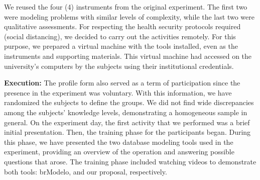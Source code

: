 We reused the four (4) instruments from the original experiment. 
The first two were modeling problems with similar levels of complexity, while the last two were qualitative assessments.
For respecting the health security protocols required (social distancing), we decided to carry out the activities remotely.
For this purpose, we prepared a virtual machine with the tools installed, even as the instruments and supporting materials. 
This virtual machine had accessed on the university's computers by the subjects using their institutional credentials.

\textbf{Execution:} 
The profile form also served as a term of participation since the presence in the experiment was voluntary.
With this information, we have randomized the subjects to define the groups.
We did not find wide discrepancies among the subjects' knowledge levels, demonstrating a homogeneous sample in general.
On the experiment day, the first activity that we performed was a brief initial presentation.
Then, the training phase for the participants began.
During this phase, we have presented the two database modeling tools used in the experiment, providing an overview of the operation and answering possible questions that arose.
The training phase included watching videos to demonstrate both tools: brModelo, and our proposal, respectively.

